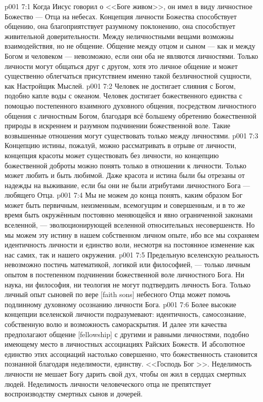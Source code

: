\vs p001 7:1 Когда Иисус говорил о <<Боге живом>>, он имел в виду личностное Божество --- Отца на небесах. Концепция личности Божества способствует общению, она благоприятствует разумному поклонению, она способствует живительной доверительности. Между неличностными вещами возможны взаимодействия, но не общение. Общение между отцом и сыном --- как и между Богом и человеком --- невозможно, если они оба не являются личностями. Только личности могут общаться друг с другом, хотя это личное общение и может существенно облегчаться присутствием именно такой безличностной сущности, как Настройщик Мыслей.
\vs p001 7:2 Человек не достигает слияния с Богом, подобно капле воды с океаном. Человек достигает божественного единства с помощью постепенного взаимного духовного общения, посредством личностного общения с личностным Богом, благодаря всё большему обретению божественной природы в искреннем и разумном подчинении божественной воле. Такие возвышенные отношения могут существовать только между личностями.
\vs p001 7:3 \pc Концепцию истины, пожалуй, можно рассматривать в отрыве от личности, концепция красоты может существовать без личности, но концепцию божественной доброты можно понять только в отношении к личности. Только  может любить и быть любимой. Даже красота и истина были бы отрезаны от надежды на выживание, если бы они не были атрибутами личностного Бога --- любящего Отца.
\vs p001 7:4 \pc Мы не можем до конца понять, каким образом Бог может быть первичным, неизменным, всемогущим и совершенным, и в то же время быть окружённым постоянно меняющейся и явно ограниченной законами вселенной, --- эволюционирующей вселенной относительных несовершенств. Но мы можем  эту истину в нашем собственном личном опыте, ибо все мы сохраняем идентичность личности и единство воли, несмотря на постоянное изменение как нас самих, так и нашего окружения.
\vs p001 7:5 Предельную вселенскую реальность невозможно постичь математикой, логикой или философией, --- только личным опытом в постепенном подчинении божественной воле личностного Бога. Ни наука, ни философия, ни теология не могут подтвердить личность Бога. Только личный опыт сыновей по вере [faith sons] небесного Отца может помочь подлинному духовному осознанию личности Бога.
\vs p001 7:6 \pc Более высокие концепции вселенской личности подразумевают: идентичность, самосознание, собственную волю и возможность самораскрытия. И далее эти качества предполагают общение [fellowship] с другими и равными личностями, подобно имеющему место в личностных ассоциациях Райских Божеств. И абсолютное единство этих ассоциаций настолько совершенно, что божественность становится познанной благодаря неделимости, единству. <<Господь Бог >>. Неделимость личности не мешает Богу дарить свой дух, чтобы он жил в сердцах смертных людей. Неделимость личности человеческого отца не препятствует воспроизводству смертных сынов и дочерей.
